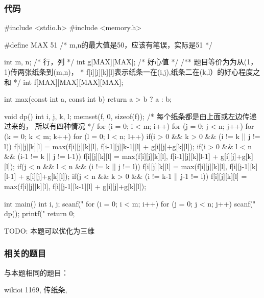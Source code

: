 \subsubsection{代码}

\begin{Codex}[label=deliver_note.c]
#include <stdio.h>
#include <memory.h>

#define MAX 51  /* m,n的最大值是50，应该有笔误，实际是51 */

int m, n;           /* 行，列 */
int g[MAX][MAX];    /* 好心值 */
/** 题目等价为为从(1，1)传两张纸条到(m,n)，
 * f[i][j][k][l]表示纸条一在(i,j),纸条二在(k,l）的好心程度之和
 */
int f[MAX][MAX][MAX][MAX];

int max(const int a, const int b) {
    return a > b ? a : b;
}

void dp() {
    int i, j, k, l;
    memset(f, 0, sizeof(f));
    /* 每个纸条都是由上面或左边传递过来的， 所以有四种情况 */
    for (i = 0; i < m; i++) {
        for (j = 0; j < n; j++) {
            for (k = 0; k < m; k++) {
                for (l = 0; l < n; l++) {
                    if(i > 0 && k > 0 && (i != k || j != l))
                        f[i][j][k][l] = max(f[i][j][k][l],
                                f[i-1][j][k-1][l] + g[i][j]+g[k][l]);
                    if(i > 0 && l < n && (i-1 != k || j != l-1))
                        f[i][j][k][l] = max(f[i][j][k][l],
                                f[i-1][j][k][l-1] + g[i][j]+g[k][l]);
                    if(j < n && l < n && (i != k || j != l))
                        f[i][j][k][l] = max(f[i][j][k][l],
                                f[i][j-1][k][l-1] + g[i][j]+g[k][l]);
                    if(j < n && k > 0 && (i != k-1 || j-1 != l))
                        f[i][j][k][l] = max(f[i][j][k][l],
                                f[i][j-1][k-1][l] + g[i][j]+g[k][l]);
                }
            }
        }
    }
}

int main() {
    int i, j;
    scanf("%
    for (i = 0; i < m; i++) {
        for (j = 0; j < n; j++) {
            scanf("%
        }
    }
    dp();
    printf("%
    return 0;
}
\end{Codex}

TODO: 本题可以优化为三维

\subsubsection{相关的题目}
与本题相同的题目：
\begindot
\item wikioi 1169, 传纸条, 
\myenddot

